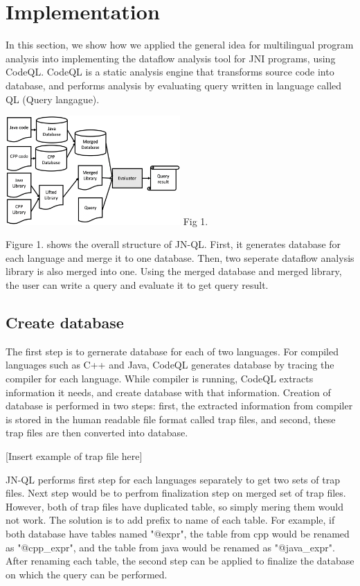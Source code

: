 \section{Implementation}
In this section, we show how we applied the general idea for multilingual
program analysis into implementing the dataflow analysis tool for JNI programs,
using CodeQL. CodeQL is a static analysis engine that transforms source code
into database, and performs analysis by evaluating query written in language
called QL (Query langague).

\includegraphics[width=0.5\textwidth]{img/Fig1}
Fig 1.

Figure 1. shows the overall structure of JN-QL. First, it generates database
for each language and merge it to one database. Then, two seperate dataflow
analysis library is also merged into one. Using the merged database and
merged library, the user can write a query and evaluate it to get query
result.

\subsection{Create database}
The first step is to gernerate database for each of two languages.  For
compiled languages such as C++ and Java, CodeQL generates database by tracing
the compiler for each language. While compiler is running, CodeQL extracts
information it needs, and create database with that information.  Creation of
database is performed in two steps: first, the extracted information from
compiler is stored in the human readable file format called trap files, and
second, these trap files are then converted into database.

[Insert example of trap file here]

JN-QL performs first step for each languages separately to get two sets of trap
files.  Next step would be to perfrom finalization step on merged set of trap
files. However, both of trap files have duplicated table, so simply mering them
would not work. The solution is to add prefix to name of each table. For
example, if both database have tables named "@expr", the table from cpp would
be renamed as "@cpp\_expr", and the table from java would be renamed as
"@java\_expr". After renaming each table, the second step can be applied to
finalize the database on which the query can be performed.

